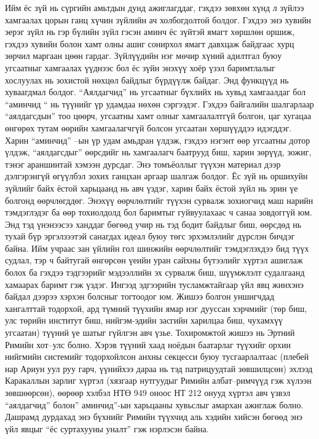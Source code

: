 Ийм ёс зүй нь сүргийн амьтдын дунд ажиглагддаг, гэхдээ зөвхөн хүнд л зүйлээ хамгаалах цорын ганц хүчин зүйлийн ач холбогдолтой болдог. Гэхдээ энэ хувийн эерэг зүйл нь гэр бүлийн зүйл гэсэн аминч ёс зүйтэй ямагт хөршлөн оршиж, гэхдээ хувийн болон хамт олны ашиг сонирхол ямагт давхцаж байдгаас хурц зөрчил маргаан цөөн гардаг. Зүйлүүдийн нэг мөчир хүний адилтгал буюу угсаатныг хамгаалах үүднээс бол ёс зүйн энэхүү хоёр үзэл баримтлалыг хослуулах нь зохистой нөхцөл байдлыг бүрдүүлж байдаг. Энд функцүүд нь хуваагдмал болдог. “Аялдагчид” нь угсаатныг бүхлийх нь хувьд хамгаалдаг бол “аминчид “ нь түүнийг үр удамдаа нөхөн сэргээдэг. Гэхдээ байгалийн шалгарлаар “аялдагсдын” тоо цөөрч, угсаатны хамт олныг хамгаалалтгүй болгон, цаг хугацаа өнгөрөх тутам өөрийн хамгаалагчгүй болсон угсаатан хөршүүддээ идэгддэг. Харин “аминчид” –ын үр удам амьдран үлдэж, гэхдээ нэгэнт өөр угсаатны дотор үлдэж, “аялдагсдыг” өөрсдийг нь хамгаалагч баатрууд биш, харин зөрүүд, зожиг, тэнэг араншинтай хэмээн дурсдаг. Энэ томъёоллыг түүхэн материал дээр дэлгэрэнгүй өгүүлбэл зохих ганцхан аргаар шалгаж болдог. Ёс зүй нь оршихуйн зүйлийг байх ёстой харьцаанд нь авч үздэг, харин байх ёстой зүйл нь эрин үе болгонд өөрчлөгддөг. Энэхүү өөрчлөлтийг түүхэн сурвалж зохиогчид маш нарийн тэмдэглэдэг ба өөр тохиолдолд бол баримтыг гуйвуулахаас ч санаа зовдоггүй юм. Энд тэд үнэнээсээ ханддаг бөгөөд учир нь тэд бодит байдлыг биш, өөрсдөд нь тухай бүр эргэлзээтэй санагдах идеал буюу төгс эрхэмлэлийг дүрслэн бичдэг байна. Ийм учраас зан үйлийн гол шинжийн өөрчлөлтийг тэмдэглэхдээ бид түүх судлал, тэр ч байтугай өнгөрсөн үеийн уран сайхны бүтээлийг хүртэл ашиглаж болох ба гэхдээ тэдгээрийг мэдээллийн эх сурвалж биш, шүүмжлэлт судалгаанд хамаарах баримт гэж үздэг. Ингээд эдгээрийн тусламжтайгаар үйл явц жинхэнэ байдал дээрээ хэрхэн болсныг тогтоодог юм. Жишээ болгон уншигчдад хангалттай тодорхой, ард түмний түүхийн ямар нэг дууссан хэрчмийг (төр биш, улс төрийн институт биш, нийгэм-эдийн засгийн харилцаа биш, чухамхүү угсаатан) түүний үе шатыг гүйлгэн авч үзье. Тохиромжтой жишээ нь Эртний Римийн хот–улс болно. Хэрэв түүний хаад ноёдын баатарлаг түүхийг орхин нийгмийн системийг тодорхойлсон анхны секцесси буюу тусгаарлалтаас (плебей нар Ариун уул руу гарч, үүнийхээ дараа нь тэд патрицуудтай зөвшилцсөн) эхлээд Каракаллын зарлиг хүртэл (хязгаар нутгуудыг Римийн албат–римчүүд гэж хүлээн зөвшөөрсөн), өөрөөр хэлбэл НТӨ 949 оноос НТ 212 онууд хүртэл авч үзвэл “аялдагчид” болон” аминчид”-ын харьцааны хувьслыг амархан ажиглаж болно. Дашрамд дурдахад энэ бүхнийг Римийн түүхчид аль хэдийн хийсэн бөгөөд энэ үйл явцыг “ёс суртахууны уналт” гэж нэрлэсэн байна.
